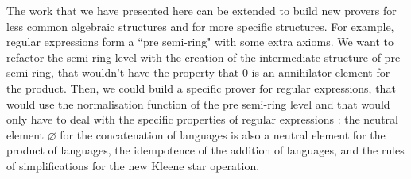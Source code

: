 The work that we have presented here can be extended to build new provers for less common algebraic structures and for more specific structures. For example, regular expressions form a ``pre semi-ring" with some extra axioms. We want to refactor the semi-ring level with the creation of the intermediate structure of pre semi-ring, that wouldn't have the property that $0$ is an annihilator element for the product. Then, we could build a specific prover for regular expressions, that would use the normalisation function of the pre semi-ring level and that would only have to deal with the specific properties of regular expressions : the neutral element $\varnothing$ for the concatenation of languages is also a neutral element for the product of languages, the idempotence of the addition of languages, and the rules of simplifications for the new Kleene star operation.


